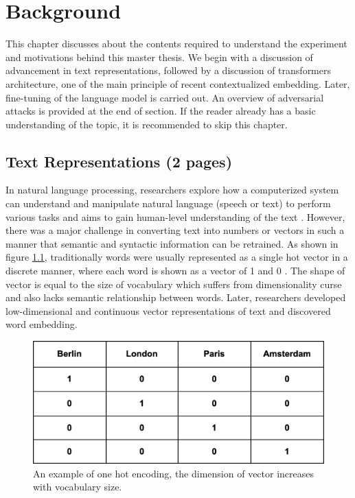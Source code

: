\documentclass[%
	BCOR=8mm, %
	DIV=12,
	toc=bibliography, %
	toc=listof, %
	oneside, %
	egregdoesnotlikesansseriftitles, %
	]{scrbook}
\begin{document}
\chapter{Background}
\label{section:background}
This chapter discusses about the contents required to understand the experiment and motivations behind this master thesis. We begin with a discussion of advancement in text representations, followed by a discussion of transformers architecture, one of the main principle of recent contextualized embedding. Later, fine-tuning of the language model is carried out. An overview of adversarial attacks is provided at the end of  section. If the reader already has a basic understanding of the topic, it is recommended to skip this chapter.
\section{Text Representations (2 pages)}
\label{section: textrep}
In natural language processing, researchers explore how a computerized system can understand and manipulate natural language (speech or text) to perform various tasks\cite{chowdhury_natural_2003} and aims to gain human-level understanding of the text \cite{naseem_comprehensive_2020}. However, there was a major challenge in converting text into numbers or vectors in such a manner that semantic and syntactic information can be retrained. As shown in figure \ref{fig:onehot}, traditionally words were usually represented as a single hot vector in a discrete manner, where each word is shown as a vector of 1 and 0 \cite{salton_vector_1975}. The shape of vector is equal to the size of vocabulary which suffers from dimensionality curse and also lacks semantic relationship between words. Later, researchers developed low-dimensional and continuous vector representations of text and discovered word embedding.
\begin{figure}[h!]
    \centering
    \includegraphics[width=0.4\linewidth]{img/onehot.png}
    \caption[Example of one hot encoding.]{ An example of one hot encoding, the dimension of vector increases with vocabulary size.}
    \label{fig:onehot}
\end{figure}
\end{document}
